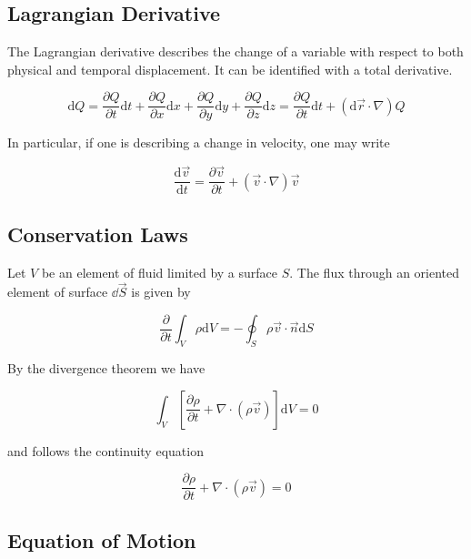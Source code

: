 \documentclass{article}
\begin{document}
\subsection{Lagrangian Derivative}

The Lagrangian derivative describes the change of a variable with respect to
both physical and temporal displacement. It can be identified with a total derivative.

\begin{equation*}
  \mathrm{d} Q=\frac{\partial Q}{\partial t} \mathrm{d} t+\frac{\partial Q}{\partial x} \mathrm{d} x+\frac{\partial Q}{\partial y} \mathrm{d} y+\frac{\partial Q}{\partial z} \mathrm{d} z=\frac{\partial Q}{\partial t} \mathrm{d} t+(\mathrm{d} \vec{r} \cdot \nabla) Q
\end{equation*}

In particular, if one is describing a change in velocity, one may write

\begin{equation*}
  \frac{\mathrm{d} \vec{v}}{\mathrm{d} t}=\frac{\partial \vec{v}}{\partial t}+(\vec{v} \cdot \nabla) \vec{v}
\end{equation*}

\subsection{Conservation Laws}
\label{sec:conservation_laws}

Let $V$ be an element of fluid limited by a surface $S$. The flux through an
oriented element of surface $\dd{\vec{S}}$ is given by

\begin{equation*}
  \frac{\partial}{\partial t} \int_{V} \rho \mathrm{d} V=-\oint_{S} \rho \vec{v} \cdot \vec{n} \mathrm{d} S
\end{equation*}

By the divergence theorem we have

\begin{equation*}
  \int_{V}\left[\frac{\partial \rho}{\partial t}+\nabla \cdot(\rho \vec{v})\right] \mathrm{d} V=0
\end{equation*}

and follows the continuity equation

\begin{equation}
  \label{eq:continuity}
  \frac{\partial \rho}{\partial t}+\nabla \cdot(\rho \vec{v})=0
\end{equation}


\subsection{Equation of Motion}
\end{document}
